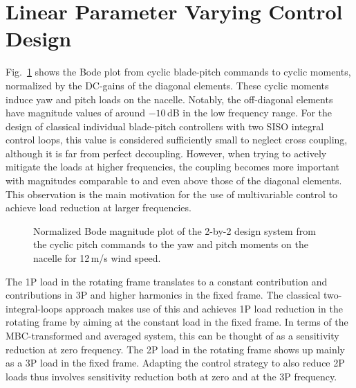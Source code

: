 \documentclass[times]{weauth}
\begin{document}
\section{Linear Parameter Varying Control Design}

Fig.~\ref{fig:linmodl} shows the Bode plot from cyclic blade-pitch commands to
cyclic moments, normalized by the DC-gains of the diagonal elements.
 These cyclic moments induce yaw and pitch loads on the nacelle. 
Notably, the off-diagonal elements have magnitude values of around $-10$\,dB in the low frequency range.
For the design of classical individual blade-pitch controllers with two SISO integral control loops, this value is considered sufficiently small to neglect cross coupling, although it is far from perfect decoupling.
However, when trying to actively mitigate the loads at higher frequencies, the coupling becomes more important with magnitudes comparable to and even above those of the diagonal elements. 
This observation is the main motivation for the use of multivariable control to
achieve load reduction at larger frequencies.

%
\begin{figure}[b]
	\centering
		
	\caption{Normalized Bode magnitude plot of the 2-by-2 design system from the cyclic pitch commands
		 to the yaw and pitch moments on the nacelle for 12\,m/s wind speed.}
	\label{fig:linmodl}	
\end{figure}




The 1P load in the rotating frame translates to a constant contribution and
contributions in 3P and higher harmonics in the fixed frame. The classical
two-integral-loops approach makes use of this and achieves 1P load
reduction in the rotating frame by aiming at the constant load
in the fixed frame. In terms of the MBC-transformed and averaged system, this
can be thought of as a sensitivity reduction at zero frequency.
The 2P load in the rotating frame shows up mainly as a 3P load in the fixed frame. Adapting the control strategy to also reduce 2P loads thus involves sensitivity reduction both at zero and at the 3P frequency. 
\end{document}
